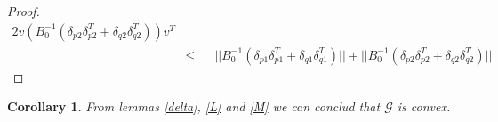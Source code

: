 \documentclass[11pt,twocolumn,varwidth=true,a4paper,fleqn]{article}
\newtheorem{corollary}{Corollary}
\begin{document}
\begin{proof}
\begin{alignat*}{2}
v(B_0^{-1}(\delta_{p2}\delta_{p2}^T + \delta_{q2}\delta_{q2}^T))v^T \\
& \leq &&  ||B_0^{-1}(\delta_{p1}\delta_{p1}^T + \delta_{q1}\delta_{q1}^T)|| +
||B_0^{-1}(\delta_{p2}\delta_{p2}^T + \delta_{q2}\delta_{q2}^T)||
\end{alignat*}
\end{proof}

\begin{corollary}
From lemmas \ref{delta}, \ref{L} and \ref{M} we can conclud that $\mathcal{G}$
is convex.
\end{corollary}
\end{document}

